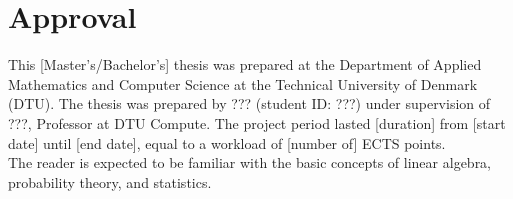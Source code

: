 \section*{Approval}
This [Master's/Bachelor's] thesis was prepared at the Department of Applied Mathematics and Computer Science at the Technical
University of Denmark (DTU). The thesis was prepared by ??? (student ID: ???) under supervision of ???, Professor
at DTU Compute. The project period lasted [duration] from [start date] until [end date], equal to a workload of
[number of] ECTS points. \\

The reader is expected to be familiar with the basic concepts of linear algebra, probability theory, and statistics.

\vfill

\begin{center}
\namesigdate{\thesisauthor~-~\studentnumber}
\end{center}

\vfill
